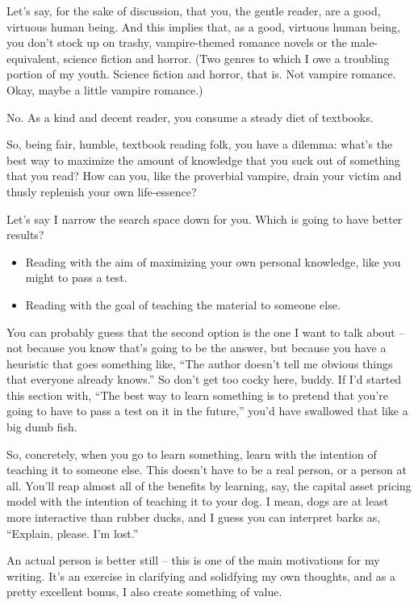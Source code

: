 Let's say, for the sake of discussion, that you, the gentle reader, are
a good, virtuous human being. And this implies that, as a good, virtuous
human being, you don't stock up on trashy, vampire-themed romance novels
or the male-equivalent, science fiction and horror. (Two genres to which
I owe a troubling portion of my youth. Science fiction and horror, that
is. Not vampire romance. Okay, maybe a little vampire romance.)

No. As a kind and decent reader, you consume a steady diet of textbooks.

So, being fair, humble, textbook reading folk, you have a dilemma:
what's the best way to maximize the amount of knowledge that you suck
out of something that you read? How can you, like the proverbial
vampire, drain your victim and thusly replenish your own life-essence?

Let's say I narrow the search space down for you. Which is going to have
better results?

\begin{itemize}
\itemsep1pt\parskip0pt
\item
  Reading with the aim of maximizing your own personal knowledge, like
  you might to pass a test.
\item
  Reading with the goal of teaching the material to someone else.
\end{itemize}

You can probably guess that the second option is the one I want to talk
about -- not because you know that's going to be the answer, but because
you have a heuristic that goes something like, ``The author doesn't tell
me obvious things that everyone already knows.'' So don't get too cocky
here, buddy. If I'd started this section with, ``The best way to learn
something is to pretend that you're going to have to pass a test on it
in the future,'' you'd have swallowed that like a big dumb fish.

So, concretely, when you go to learn something, learn with the intention
of teaching it to someone else. This doesn't have to be a real person,
or a person at all. You'll reap almost all of the benefits by learning,
say, the capital asset pricing model with the intention of teaching it
to your dog. I mean, dogs are at least more interactive than rubber
ducks, and I guess you can interpret barks as, ``Explain, please. I'm
lost.''

An actual person is better still -- this is one of the main motivations
for my writing. It's an exercise in clarifying and solidfying my own
thoughts, and as a pretty excellent bonus, I also create something of
value.


